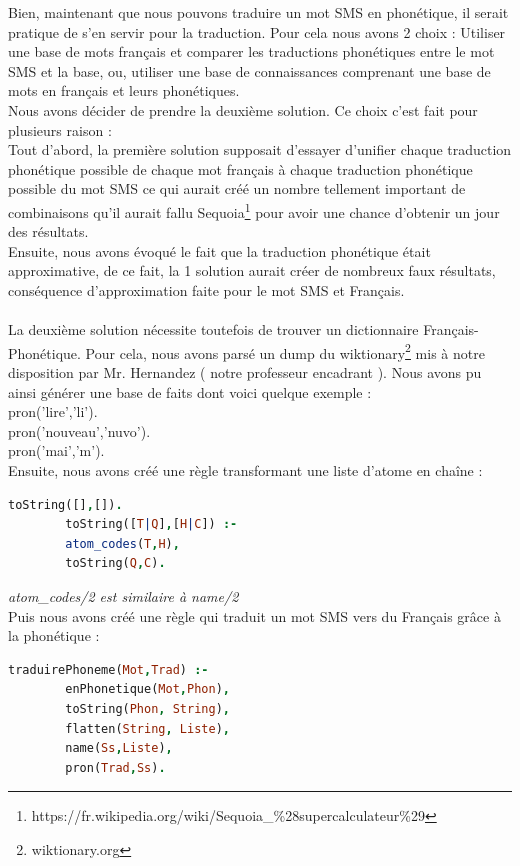 \documentclass[11pt]{report}
\begin{document}
	Bien, maintenant que nous pouvons traduire un mot SMS en phonétique, il serait pratique de s'en servir pour la traduction. Pour cela nous avons 2 choix : Utiliser une base de mots français et comparer les traductions phonétiques entre le mot SMS et la base, ou, utiliser une base de connaissances comprenant une base de mots en français et leurs phonétiques.\\
	Nous avons décider de prendre la deuxième solution. Ce choix c'est fait pour plusieurs raison :\\
	Tout d'abord, la première solution supposait d'essayer d'unifier chaque traduction phonétique possible de chaque mot français à chaque traduction phonétique possible du mot SMS ce qui aurait créé un nombre tellement important de combinaisons qu'il aurait fallu Sequoia\footnote{https://fr.wikipedia.org/wiki/Sequoia\_\%28supercalculateur\%29} pour avoir une chance d'obtenir un jour des résultats.\\
	Ensuite, nous avons évoqué le fait que la traduction phonétique était approximative, de ce fait, la 1 solution aurait créer de nombreux faux résultats, conséquence d'approximation faite pour le mot SMS et Français.
	\paragraph{}
	La deuxième solution nécessite toutefois de trouver un dictionnaire Français-Phonétique. Pour cela, nous avons parsé un dump du wiktionary\footnote{wiktionary.org} mis à notre disposition par Mr. Hernandez ( notre professeur encadrant ).
	Nous avons pu ainsi générer une base de faits dont voici quelque exemple :\\
	
	\indent pron('lire','li').\\
	\indent pron('nouveau','nuvo').\\
	\indent pron('mai','m').\\
	
	Ensuite, nous avons créé une règle transformant une liste d'atome en chaîne :
	\begin{lstlisting}[language=Prolog]
	toString([],[]).
		toString([T|Q],[H|C]) :-
		atom_codes(T,H),
		toString(Q,C).
	\end{lstlisting}
	
	{\em atom\_codes/2 est similaire à name/2}\\
	
	Puis nous avons créé une règle qui traduit un mot SMS vers du Français grâce à la phonétique :
	\begin{lstlisting}[language=Prolog]
	traduirePhoneme(Mot,Trad) :-
		enPhonetique(Mot,Phon),
		toString(Phon, String),
		flatten(String, Liste),
		name(Ss,Liste),
		pron(Trad,Ss).
	\end{lstlisting}
	
\end{document}
